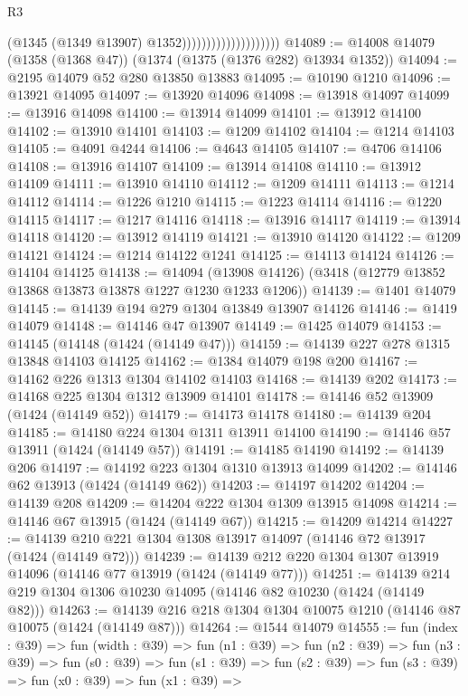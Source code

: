 \begin{lexlean}{R3}
\begin{coremodule}
                                          (@1345 (@1349 @13907) @1352))))))))))))))))))))
@14089 := @14008 @14079 (@1358 (@1368 @47)) (@1374 (@1375 (@1376 @282) @13934 @1352))
@14094 := @2195 @14079 @52 @280 @13850 @13883
@14095 := @10190 @1210
@14096 := @13921 @14095
@14097 := @13920 @14096
@14098 := @13918 @14097
@14099 := @13916 @14098
@14100 := @13914 @14099
@14101 := @13912 @14100
@14102 := @13910 @14101
@14103 := @1209 @14102
@14104 := @1214 @14103
@14105 := @4091 @4244
@14106 := @4643 @14105
@14107 := @4706 @14106
@14108 := @13916 @14107
@14109 := @13914 @14108
@14110 := @13912 @14109
@14111 := @13910 @14110
@14112 := @1209 @14111
@14113 := @1214 @14112
@14114 := @1226 @1210
@14115 := @1223 @14114
@14116 := @1220 @14115
@14117 := @1217 @14116
@14118 := @13916 @14117
@14119 := @13914 @14118
@14120 := @13912 @14119
@14121 := @13910 @14120
@14122 := @1209 @14121
@14124 := @1214 @14122 @1241
@14125 := @14113 @14124
@14126 := @14104 @14125
@14138 := @14094
    (@13908 @14126)
    (@3418 (@12779 @13852 @13868 @13873 @13878 @1227 @1230 @1233 @1206))
@14139 := @1401 @14079
@14145 := @14139 @194 @279 @1304 @13849 @13907 @14126
@14146 := @1419 @14079
@14148 := @14146 @47 @13907
@14149 := @1425 @14079
@14153 := @14145 (@14148 (@1424 (@14149 @47)))
@14159 := @14139 @227 @278 @1315 @13848 @14103 @14125
@14162 := @1384 @14079 @198 @200
@14167 := @14162 @226 @1313 @1304 @14102 @14103
@14168 := @14139 @202
@14173 := @14168 @225 @1304 @1312 @13909 @14101
@14178 := @14146 @52 @13909 (@1424 (@14149 @52))
@14179 := @14173 @14178
@14180 := @14139 @204
@14185 := @14180 @224 @1304 @1311 @13911 @14100
@14190 := @14146 @57 @13911 (@1424 (@14149 @57))
@14191 := @14185 @14190
@14192 := @14139 @206
@14197 := @14192 @223 @1304 @1310 @13913 @14099
@14202 := @14146 @62 @13913 (@1424 (@14149 @62))
@14203 := @14197 @14202
@14204 := @14139 @208
@14209 := @14204 @222 @1304 @1309 @13915 @14098
@14214 := @14146 @67 @13915 (@1424 (@14149 @67))
@14215 := @14209 @14214
@14227 := @14139 @210 @221 @1304 @1308 @13917 @14097 (@14146 @72 @13917 (@1424 (@14149 @72)))
@14239 := @14139 @212 @220 @1304 @1307 @13919 @14096 (@14146 @77 @13919 (@1424 (@14149 @77)))
@14251 := @14139 @214 @219 @1304 @1306 @10230 @14095 (@14146 @82 @10230 (@1424 (@14149 @82)))
@14263 := @14139 @216 @218 @1304 @1304 @10075 @1210 (@14146 @87 @10075 (@1424 (@14149 @87)))
@14264 := @1544 @14079
@14555 := fun (index : @39) =>
  fun (width : @39) =>
  fun (n1 : @39) =>
  fun (n2 : @39) =>
  fun (n3 : @39) =>
  fun (s0 : @39) =>
  fun (s1 : @39) =>
  fun (s2 : @39) =>
  fun (s3 : @39) =>
  fun (x0 : @39) =>
  fun (x1 : @39) =>

\end{coremodule}
\end{lexlean}
